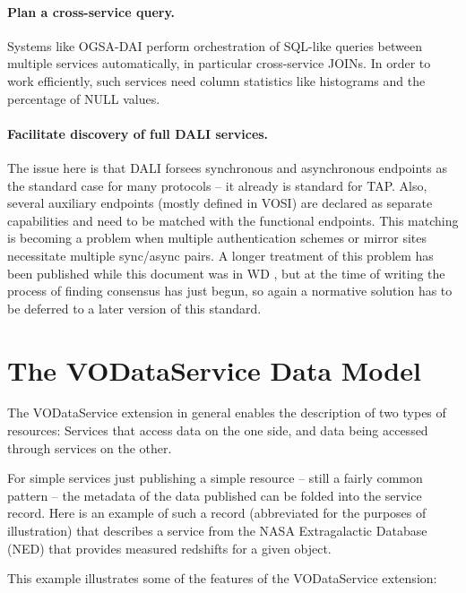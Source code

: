\documentclass[11pt,a4paper]{ivoa}
\begin{document}
\paragraph{Plan a cross-service query.} Systems like OGSA-DAI
\citep{2011ASPC..442..579H} perform orchestration of SQL-like queries
between multiple services automatically, in particular cross-service
JOINs.  In order to work efficiently, such services need column
statistics like histograms and the percentage of NULL values.


\paragraph{Facilitate discovery of full DALI services.}  The issue here
is that DALI forsees synchronous and asynchronous endpoints as the
standard case for many protocols -- it already is standard for TAP.
Also, several auxiliary endpoints (mostly defined in VOSI) are declared as
separate capabilities and need to be matched with the functional
endpoints.  This matching is becoming a problem when multiple
authentication schemes or mirror sites necessitate multiple sync/async
pairs.  A longer treatment of this problem has been published while this
document was in WD \citep{note:caproles}, but at the time of writing the
process of finding consensus has just begun, so again a normative
solution has to be deferred to a later version of this standard.



\section{The VODataService Data Model}
\label{sect:model}


The VODataService extension in general enables the description of two
types of resources:  Services that access data on the one side, and data
being accessed through services on the other.

For simple services just publishing a simple resource -- still a fairly
common pattern -- the metadata of the data published can be folded into
the service record.
Here is an example of such a record (abbreviated for the
purposes of illustration) that describes a service from the NASA
Extragalactic Database (NED) that provides measured redshifts for a
given object.




This example illustrates some of the features of the VODataService
extension:
\end{document}
